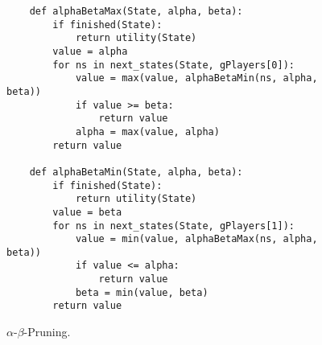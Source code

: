 \begin{figure}[!ht]
\centering
\begin{verbatim}
    def alphaBetaMax(State, alpha, beta):
        if finished(State):
            return utility(State)
        value = alpha
        for ns in next_states(State, gPlayers[0]):
            value = max(value, alphaBetaMin(ns, alpha, beta))
            if value >= beta:
                return value
            alpha = max(value, alpha)
        return value
    
    def alphaBetaMin(State, alpha, beta):
        if finished(State):
            return utility(State)
        value = beta
        for ns in next_states(State, gPlayers[1]):
            value = min(value, alphaBetaMax(ns, alpha, beta))
            if value <= alpha:
                return value
            beta = min(value, beta)
        return value    
\end{verbatim}
\caption{$\alpha$-$\beta$-Pruning.}
\label{fig:Alpha-Beta-Pruning.ipynb:alphaBeta}
\end{figure}
\FloatBarrier

